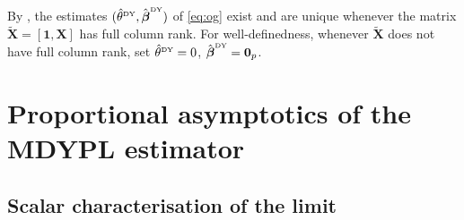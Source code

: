 \documentclass{article}
\makeatletter
\theoremstyle{definition}
\newcommand{\vnorm}[1]{%
	\ensuremath{%
		\if@display
		\left\| #1 \right\|
		\else
		\| #1 \|
		\fi
	}%
}
\newcommand*{\bb}{\boldsymbol}
\newcommand{\betady}{\ensuremath{\hat{\bbeta}^{\textrm{\tiny DY}}}}
\newcommand{\thetady}{\ensuremath{\hat{\theta}^{\textrm{\tiny DY}}}}
\def\bX{\bb{X}}
\def\bbeta{\bb{\beta}}
\makeatother
\begin{document}
\begin{bibunit}
By \citet[][Theorem~1]{rigon+aliverti:2023}, the estimates $(\thetady, \betady)$ of \eqref{eq:og} exist and are unique whenever the matrix $\widetilde{\bX} = [\bb 1,  \bX]$ has full column rank.
For well-definedness, whenever $\widetilde{\bX}$ does not have full column rank, set $\thetady = 0$, $\betady = \bb 0_{p }$.

\section{Proportional asymptotics of the MDYPL estimator}
\label{sec:results}

\subsection{Scalar characterisation of the limit}
\label{sec:limiting-ao-focs}


\end{bibunit}
\end{document}
